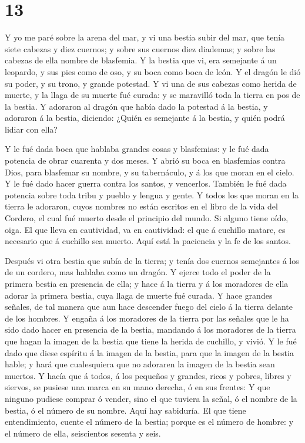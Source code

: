 \hypertarget{section-12}{%
\section{13}\label{section-12}}

 Y yo me paré sobre la arena del mar, y vi una bestia
subir del mar, que tenía siete cabezas y diez cuernos; y sobre sus
cuernos diez diademas; y sobre las cabezas de ella nombre de blasfemia.
 Y la bestia que vi, era semejante á un leopardo, y sus
pies como de oso, y su boca como boca de león. Y el dragón le dió su
poder, y su trono, y grande potestad.  Y vi una de sus
cabezas como herida de muerte, y la llaga de su muerte fué curada: y se
maravilló toda la tierra en pos de la bestia.  Y adoraron
al dragón que había dado la potestad á la bestia, y adoraron á la
bestia, diciendo: ¿Quién es semejante á la bestia, y quién podrá lidiar
con ella?

 Y le fué dada boca que hablaba grandes cosas y
blasfemias: y le fué dada potencia de obrar cuarenta y dos meses.
 Y abrió su boca en blasfemias contra Dios, para blasfemar
su nombre, y su tabernáculo, y á los que moran en el cielo.
 Y le fué dado hacer guerra contra los santos, y
vencerlos. También le fué dada potencia sobre toda tribu y pueblo y
lengua y gente.  Y todos los que moran en la tierra le
adoraron, cuyos nombres no están escritos en el libro de la vida del
Cordero, el cual fué muerto desde el principio del mundo. 
Si alguno tiene oído, oiga.  El que lleva en cautividad,
va en cautividad: el que á cuchillo matare, es necesario que á cuchillo
sea muerto. Aquí está la paciencia y la fe de los santos.

 Después vi otra bestia que subía de la tierra; y tenía
dos cuernos semejantes á los de un cordero, mas hablaba como un dragón.
 Y ejerce todo el poder de la primera bestia en presencia
de ella; y hace á la tierra y á los moradores de ella adorar la primera
bestia, cuya llaga de muerte fué curada.  Y hace grandes
señales, de tal manera que aun hace descender fuego del cielo á la
tierra delante de los hombres.  Y engaña á los moradores
de la tierra por las señales que le ha sido dado hacer en presencia de
la bestia, mandando á los moradores de la tierra que hagan la imagen de
la bestia que tiene la herida de cuchillo, y vivió.  Y le
fué dado que diese espíritu á la imagen de la bestia, para que la imagen
de la bestia hable; y hará que cualesquiera que no adoraren la imagen de
la bestia sean muertos.  Y hacía que á todos, á los
pequeños y grandes, ricos y pobres, libres y siervos, se pusiese una
marca en su mano derecha, ó en sus frentes:  Y que
ninguno pudiese comprar ó vender, sino el que tuviera la señal, ó el
nombre de la bestia, ó el número de su nombre.  Aquí hay
sabiduría. El que tiene entendimiento, cuente el número de la bestia;
porque es el número de hombre: y el número de ella, seiscientos sesenta
y seis.

